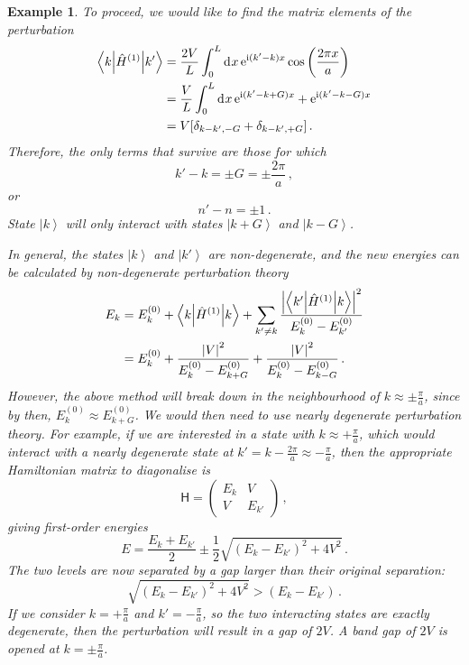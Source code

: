 \documentclass{article}
\theoremstyle{plain}\theoremheaderfont{\normalfont\itshape}\theorembodyfont{\rmfamily}\theoremseparator{.}\newtheorem*{rem}{Remark}\newtheorem*{ex}{Example}\newtheorem*{proof}{Proof}\newtheorem*{altp}{Alternative proof}
\theoremstyle{plain}\theoremheaderfont{\normalfont\bfseries}\theorembodyfont{\rmfamily}\theoremseparator{.}\newtheorem{thm}{Theorem}[section]\newtheorem{lem}[thm]{Lemma}\newtheorem{prop}[thm]{Proposition}\newtheorem*{cor}{Corollary}\newtheorem{defn}[thm]{Definition}\newtheorem{clm}[thm]{Claim}\newtheorem{clminproof}{Claim}
\theoremstyle{break}\theoremheaderfont{\normalfont\itshape}\theorembodyfont{\rmfamily}\theoremseparator{.\medskip}\newtheorem*{proofskip}{Proof}\newtheorem*{exs}{Examples}\newtheorem*{rems}{Remarks}
\theoremstyle{break}\theoremheaderfont{\normalfont\bfseries}\theorembodyfont{\rmfamily}\theoremseparator{.\medskip}\newtheorem{lemskip}[thm]{Lemma}\newtheorem{defnskip}[thm]{Definition}\newtheorem{propskip}[thm]{Proposition}\newtheorem{thmskip}[thm]{Theorem}
\numberwithin{equation}{section}
\newcommand{\ii}{\mathrm{i}}
\newcommand{\ee}{\mathrm{e}}
\newcommand{\dd}[2][]{\mathrm{d}^{#1} #2\,}
\newcommand{\ket}[1]{\left| #1 \right\rangle}
\newcommand{\mel}[3]{\left\langle #1 \middle| #2 \middle| #3 \right\rangle}
\newcommand{\expval}[2]{\left\langle #2 \middle| #1 \middle| #2 \right\rangle}
\newcommand{\abs}[1]{\left| #1 \right|}
\begin{document}
\begin{ex}
        To proceed, we would like to find the matrix elements of the perturbation
        \begin{align}
            \mel{k}{\hat{H}^{(1)}}{k'}&=\frac{2V}{L}\int_{0}^{L}\dd{x}\ee^{\ii(k'-k)x}\cos\left(\frac{2\pi x}{a}\right)\notag \\
            &=\frac{V}{L}\int_0^L\dd{x}\ee^{\ii(k'-k+G)x}+\ee^{\ii(k'-k-G)x}\notag\\
            &=V[\delta_{k-k',-G}+\delta_{k-k',+G}]\,.
        \end{align}
        Therefore, the only terms that survive are those for which
        \begin{equation}
            k'-k=\pm G=\pm\frac{2\pi}{a}\,,
        \end{equation}
        or
        \begin{equation}
            n'-n=\pm 1\,.
        \end{equation}
        State \(\ket{k}\) will only interact with states \(\ket{k+G}\) and \(\ket{k-G}\).

        In general, the states \(\ket{k}\) and \(\ket{k'}\) are non-degenerate, and the new energies can be calculated by non-degenerate perturbation theory
        \begin{align}
            E_k&=E_k^{(0)}+\expval{\hat{H}^{(1)}}{k}+\sum_{k'\ne k}\frac{\abs{\mel{k'}{\hat{H}^{(1)}}{k}}^2}{E_k^{(0)}-E_{k'}^{(0)}}\notag\\
            &=E_k^{(0)}+\frac{\abs{V}^2}{E_k^{(0)}-E_{k+G}^{(0)}}+\frac{\abs{V}^2}{E_k^{(0)}-E_{k-G}^{(0)}}\,.
        \end{align}
        However, the above method will break down in the neighbourhood of \(k\approx\pm\frac{\pi}{a}\), since by then, \(E_k^{(0)}\approx E_{k+G}^{(0)}\). We would then need to use nearly degenerate perturbation theory. For example, if we are interested in a state with \(k\approx +\frac{\pi}{a}\), which would interact with a nearly degenerate state at \(k'=k-\frac{2\pi}{a}\approx -\frac{\pi}{a}\), then the appropriate Hamiltonian matrix to diagonalise is
        \begin{equation}
            \mathsf{H}=\begin{pmatrix}
                E_k & V \\
                V & E_{k'}
            \end{pmatrix}\,,
        \end{equation}
        giving first-order energies
        \begin{equation}
            E=\frac{E_k+E_{k'}}{2}\pm\frac{1}{2}\sqrt{(E_k-E_{k'})^2+4V^2}\,.
        \end{equation}
        The two levels are now separated by a gap larger than their original separation:
        \begin{equation}
            \sqrt{(E_k-E_{k'})^2+4V^2}>(E_k-E_{k'})\,.
        \end{equation}
        If we consider \(k=+\frac{\pi}{a}\) and \(k'=-\frac{\pi}{a}\), so the two interacting states are exactly degenerate, then the perturbation will result in a gap of \(2V\). A band gap of \(2V\) is opened at \(k=\pm \frac{\pi}{a}\).


\end{ex}
\end{document}
